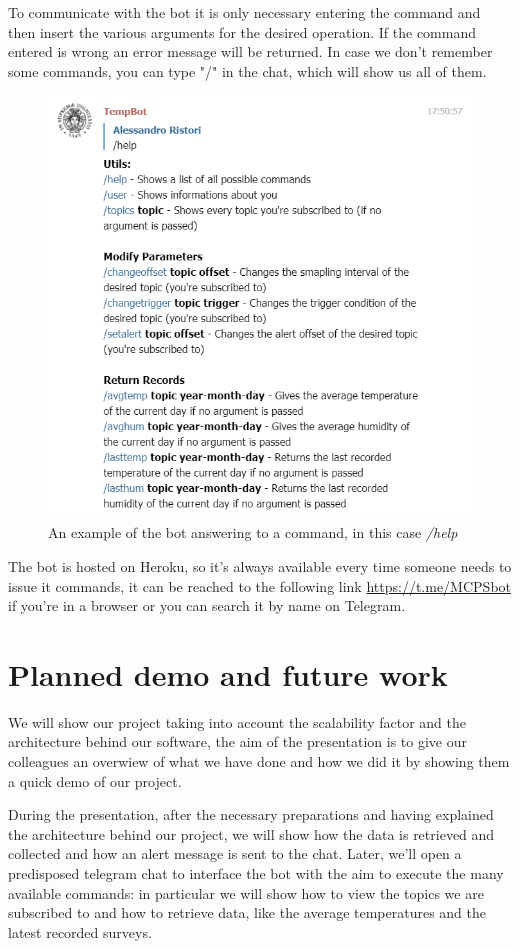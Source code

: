 To communicate with the bot it is only necessary entering the command and then insert the various arguments for the desired operation. If the command entered is wrong an error message will be returned. In case we don't remember some commands, you can type "/" in the chat, which will show us all of them.
\begin{figure}[H]%
    \centering
    \includegraphics[width=0.59\linewidth]{images/botcommand.png}
    \caption{An example of the bot answering to a command, in this case \textit{/help}}
    \label{fig:botcommand}
\end{figure}
The bot is hosted on Heroku, so it's always available every time someone needs to issue it commands, it can be reached to the following link \url{https://t.me/MCPSbot} if you're in a browser or you can search it by name on Telegram.

\section{Planned demo and future work}
We will show  our project taking into account the scalability factor and the architecture behind our software, the aim of the presentation is to give our colleagues an overwiew of what we have done and how we did it by showing them a quick demo of our project. 
\vspace{3mm}

During the presentation, after the necessary preparations and having explained the architecture behind our project, we will show how the data is retrieved and collected and how an alert message is sent to the chat. Later, we'll open a predisposed telegram chat to interface the bot with the aim to execute the many available commands: in particular we will show how to view the topics we are subscribed to and how to retrieve data, like the average temperatures and the latest recorded surveys.\vspace{3mm}

